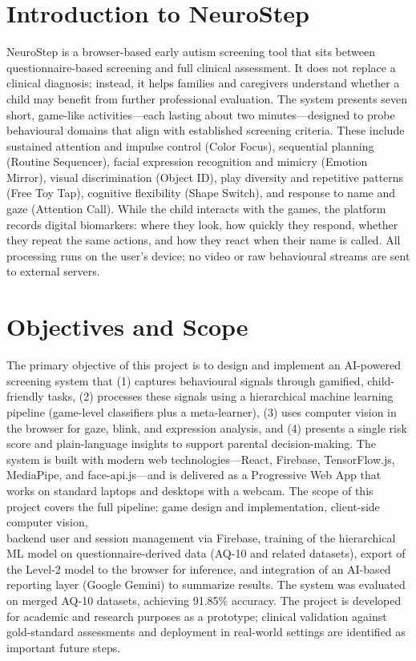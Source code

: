 \documentclass[12pt,a4paper]{report}
\begin{document}
\section{Introduction to NeuroStep}
NeuroStep is a browser-based early autism screening tool that sits between questionnaire-based screening and full clinical assessment. It does not replace a clinical diagnosis; instead, it helps families and caregivers understand whether a child may benefit from further professional evaluation. The system presents seven short, game-like activities—each lasting about two minutes—designed to probe behavioural domains that align with established screening criteria. These include sustained attention and impulse control (Color Focus), sequential planning (Routine Sequencer), facial expression recognition and mimicry (Emotion Mirror), visual discrimination (Object ID), play diversity and repetitive patterns (Free Toy Tap), cognitive flexibility (Shape Switch), and response to name and gaze (Attention Call). While the child interacts with the games, the platform records digital biomarkers: where they look, how quickly they respond, whether they repeat the same actions, and how they react when their name is called. All processing runs on the user's device; no video or raw behavioural streams are sent to external servers.
\section{Objectives and Scope}
The primary objective of this project is to design and implement an AI-powered screening system that (1) captures behavioural signals through gamified, child-friendly tasks, (2) processes these signals using a hierarchical machine learning pipeline (game-level classifiers plus a meta-learner), (3) uses computer vision in the browser for gaze, blink, and expression analysis, and (4) presents a single risk score and plain-language insights to support parental decision-making. The system is built with modern web technologies—React, Firebase, TensorFlow.js, MediaPipe, and face-api.js—and is delivered as a Progressive Web App that works on standard laptops and desktops with a webcam.
The scope of this project covers the full pipeline: game design and implementation, client-side computer vision,\\ backend user and session management via Firebase, training of the hierarchical ML model on questionnaire-derived data (AQ-10 and related datasets), export of the Level-2 model to the browser for inference, and integration of an AI-based reporting layer (Google Gemini) to summarize results. The system was evaluated on merged AQ-10 datasets, achieving 91.85\% accuracy. The project is developed for academic and research purposes as a prototype; clinical validation against gold-standard assessments and deployment in real-world settings are identified as important future steps.
\end{document}
